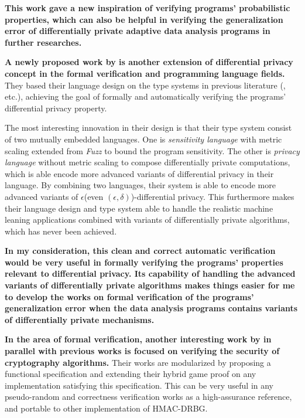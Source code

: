 \documentclass{article}
\begin{document}
\textbf{This work gave a new inspiration of verifying programs' probabilistic properties, which can also be helpful in verifying the generalization error of differentially private adaptive data analysis programs
in further researches.}


\textbf{A newly proposed work by \cite{near2019duet} is another extension of differential privacy concept in the formal verification and programming language fields.} They based their language design on the type systems in previous literature (\cite{gaboardi2013linear}, \cite{reed2010distance} etc.), achieving the goal of formally and automatically verifying the programs' differential privacy property.

The most interesting innovation in their design is that their type system consist of two mutually embedded languages. One is \emph{sensitivity language} with metric scaling extended from \emph{Fuzz} \cite{reed2010distance} to bound the program sensitivity.
The other is \emph{privacy language} without metric scaling to compose differentially private computations, which is able encode more advanced variants of differential privacy in their language. By combining two languages, their system is able to encode more advanced variants of $\epsilon$(even $(\epsilon, \delta)$)-differential privacy.
This furthermore makes their language design and type system able to handle the realistic machine leaning applications combined with variants of differentially private algorithms, which has never been achieved. 

\textbf{In my consideration, this clean and correct automatic verification would be very useful in formally verifying the programs' properties relevant to differential privacy. Its capability of handling the advanced variants of differentially private algorithms makes things easier for me to develop the works on formal verification of the programs' generalization error when the data analysis programs contains variants of differentially private mechanisms.}

\textbf{In the area of formal verification, another interesting work by \cite{ye2017verified} in parallel with previous works is focused on verifying the security of cryptography algorithms.}
Their works are modularized by proposing a functional specification and extending their hybrid game proof on any implementation satisfying this specification.
This can be very useful in any pseudo-random and correctness verification works as a high-assurance reference, and portable to other implementation of HMAC-DRBG.
\end{document}
